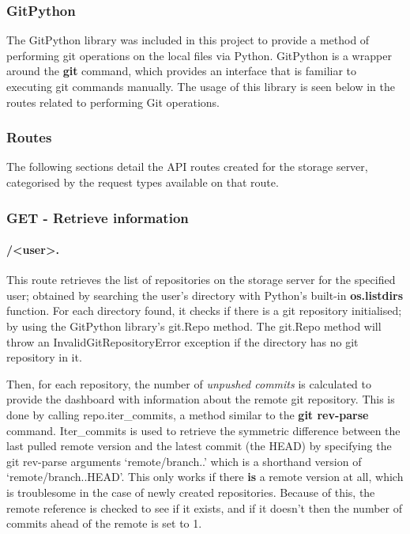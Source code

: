 	\subsubsection{GitPython}
	The GitPython library was included in this project to provide a method of performing git operations on the local files via Python. GitPython is a wrapper around the \textbf{git} command, which provides an interface that is familiar to executing git commands manually. The usage of this library is seen below in the routes related to performing Git operations.


	\subsubsection{Routes}
	The following sections detail the API routes created for the storage server, categorised by the request types available on that route.

	\subsubsection{GET - Retrieve information}
	
	\paragraph{/<user>.}
	This route retrieves the list of repositories on the storage server for the specified user; obtained by searching the user's directory with Python's built-in \textbf{os.listdirs} function. For each directory found, it checks if there is a git repository initialised; by using the GitPython library's git.Repo method. The git.Repo method will throw an InvalidGitRepositoryError exception if the directory has no git repository in it.

	Then, for each repository, the number of \emph{unpushed commits} is calculated to provide the dashboard with information about the remote git repository. This is done by calling repo.iter\_commits, a method similar to the \textbf{git rev-parse} command. Iter\_commits is used to retrieve the symmetric difference between the last pulled remote version and the latest commit (the HEAD) by specifying the git rev-parse arguments `remote/branch..' which is a shorthand version of `remote/branch..HEAD'. This only works if there \textbf{is} a remote version at all, which is troublesome in the case of newly created repositories. Because of this, the remote reference is checked to see if it exists, and if it doesn't then the number of commits ahead of the remote is set to 1.

